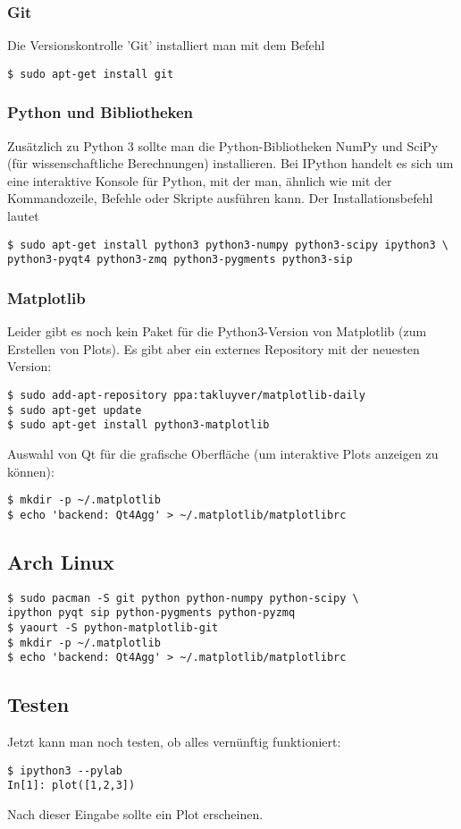 \subsubsection{Git}
Die Versionskontrolle 'Git' installiert man mit dem Befehl
\begin{verbatim}
$ sudo apt-get install git
\end{verbatim}

\subsubsection{Python und Bibliotheken}
Zusätzlich zu Python 3 sollte man die Python-Bibliotheken NumPy und SciPy (für wissenschaftliche Berechnungen) installieren.
Bei IPython handelt es sich um eine interaktive Konsole für Python, mit der man, ähnlich wie mit der Kommandozeile, Befehle oder Skripte ausführen kann.
Der Installationsbefehl lautet
\begin{verbatim}
$ sudo apt-get install python3 python3-numpy python3-scipy ipython3 \
python3-pyqt4 python3-zmq python3-pygments python3-sip
\end{verbatim}

\subsubsection{Matplotlib}
Leider gibt es noch kein Paket für die Python3-Version von Matplotlib (zum Erstellen von Plots).
Es gibt aber ein externes Repository mit der neuesten Version:
\begin{verbatim}
$ sudo add-apt-repository ppa:takluyver/matplotlib-daily
$ sudo apt-get update
$ sudo apt-get install python3-matplotlib
\end{verbatim}
Auswahl von Qt für die grafische Oberfläche (um interaktive Plots anzeigen zu können):
\begin{verbatim}
$ mkdir -p ~/.matplotlib
$ echo 'backend: Qt4Agg' > ~/.matplotlib/matplotlibrc
\end{verbatim}

\subsection{Arch Linux}
\begin{verbatim}
$ sudo pacman -S git python python-numpy python-scipy \
ipython pyqt sip python-pygments python-pyzmq
$ yaourt -S python-matplotlib-git
$ mkdir -p ~/.matplotlib
$ echo 'backend: Qt4Agg' > ~/.matplotlib/matplotlibrc
\end{verbatim}

\subsection{Testen}
Jetzt kann man noch testen, ob alles vernünftig funktioniert:
\begin{verbatim}
$ ipython3 --pylab
In[1]: plot([1,2,3])
\end{verbatim}
Nach dieser Eingabe sollte ein Plot erscheinen.
